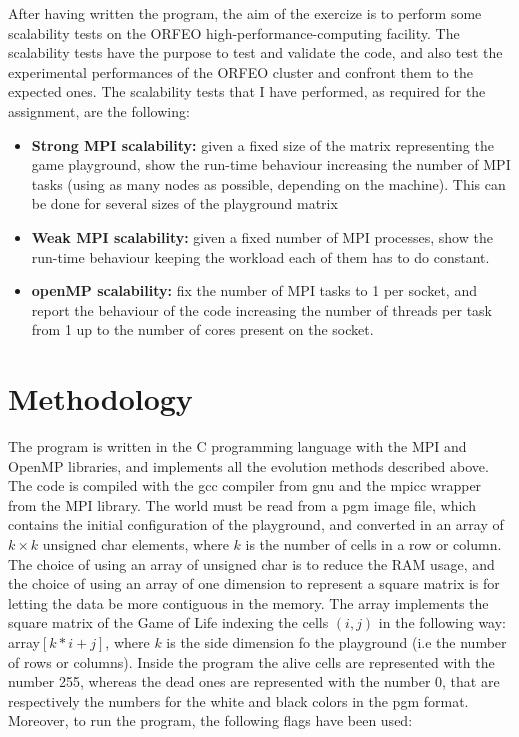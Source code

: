 \documentclass[12pt, titlepage]{report}
\begin{document}
After having written the program, the aim of the exercize is to perform some scalability tests on the ORFEO high-performance-computing facility. 
The scalability tests have the purpose to test and validate the code, and also test the experimental performances of the ORFEO cluster and confront 
them to the expected ones. The scalability tests that I have performed, as required for the assignment, are the following:
\begin{itemize}
	\item \textbf{Strong MPI scalability:} given a fixed size of the matrix representing the game playground,
	show the run-time behaviour increasing the number of MPI tasks (using as many nodes as possible, depending on the machine). This can be done for 
	several sizes of the playground matrix
	\item \textbf{Weak MPI scalability:} given a fixed number of MPI processes, show the run-time behaviour keeping the workload 
	each of them has to do constant. 
	\item \textbf{openMP scalability:} fix the number of MPI tasks to 1 per socket, and report the behaviour of the code increasing the number of
	threads per task from 1 up to the number of cores present on the socket.
\end{itemize}

\section{Methodology}\label{Methodology}

The program is written in the C programming language with the MPI and OpenMP libraries, and implements all the evolution methods described above.
The code is compiled with the gcc compiler from gnu and the mpicc wrapper from the MPI library. 
The world must be read from a pgm image file, which contains the initial configuration of the playground, and converted in an array of $k\times k$
unsigned char elements, where $k$ is the number of cells in a row or column. The choice of using an array of unsigned char is to reduce the RAM usage,
and the choice of using an array of one dimension to represent a square matrix is for letting the data be more contiguous in the memory. 
The array implements the square matrix of the Game of Life indexing the cells $(i,j)$ in the following way: array$[k*i+j]$, where $k$ is the 
side dimension fo the playground (i.e the number of rows or columns).
Inside the program the alive cells are represented with the number 255, whereas the dead ones are represented with the number 0, that are respectively
the numbers for the white and black colors in the pgm format. Moreover, to run the program, the following flags have been used:
\end{document}
